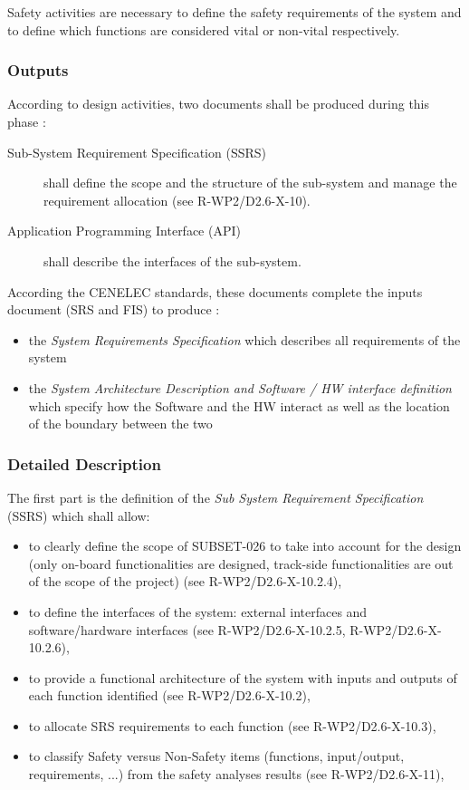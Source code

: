 Safety activities are necessary to define the safety requirements of the system and to define which functions are considered vital or non-vital respectively.

\subsubsection{Outputs}
\label{sec:sys-ana-outputs}

According to  design activities, two documents shall be produced during this phase :

\begin{description}
\item[Sub-System Requirement Specification (SSRS)] shall define the scope and the structure of the sub-system and  manage the requirement allocation (see R-WP2/D2.6-X-10).
\item[Application Programming Interface (API)] shall describe the interfaces of the sub-system.
\end{description}


According the CENELEC standards, these documents complete the inputs document (SRS and FIS) to produce :
\begin{itemize}
\item the \emph{System  Requirements Specification} which describes all requirements of the system
\item the \emph{System Architecture Description
and Software / HW interface definition } which specify how the Software and the HW interact
as well as the location of the boundary between the two
\end{itemize}

\subsubsection{Detailed Description}
\label{sec:sys-ana-descr}

The first part is the definition of the  \emph{Sub System Requirement Specification} (SSRS) which shall allow:
\begin{itemize}
\item to clearly define the scope of SUBSET-026 to take into account for the design (only on-board functionalities are designed, track-side functionalities are out of the scope of the project) (see R-WP2/D2.6-X-10.2.4),
\item to define the interfaces of the system: external interfaces and software/hardware interfaces (see R-WP2/D2.6-X-10.2.5, R-WP2/D2.6-X-10.2.6),
\item to provide a functional architecture of the system with inputs and outputs of each function identified (see R-WP2/D2.6-X-10.2),
\item to allocate SRS requirements to each function (see R-WP2/D2.6-X-10.3),
\item to classify Safety versus Non-Safety items (functions, input/output, requirements, ...) from the safety analyses results (see R-WP2/D2.6-X-11),
\end{itemize}

